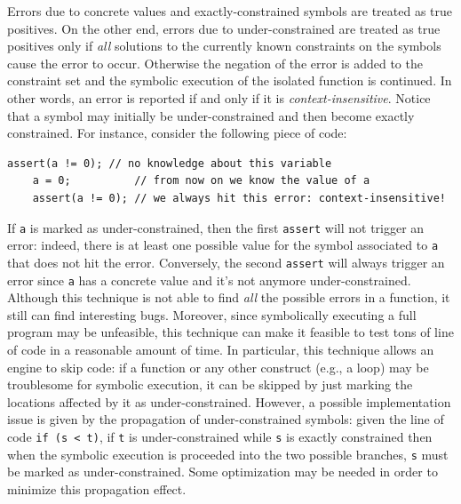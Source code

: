 Errors due to concrete values and exactly-constrained symbols are treated as true positives. On the other end, errors due to under-constrained are treated as true positives only if {\em all} solutions to the currently known constraints on the symbols cause the error to occur. Otherwise the negation of the error is added to the constraint set and the symbolic execution of the isolated function is continued. In other words, an error is reported if and only if it is {\em context-insensitive}. Notice that a symbol may initially be under-constrained and then become exactly constrained. For instance, consider the following piece of code:

    \begin{lstlisting}[basicstyle=\ttfamily\small]
    assert(a != 0); // no knowledge about this variable
    a = 0;          // from now on we know the value of a
    assert(a != 0); // we always hit this error: context-insensitive! 
    \end{lstlisting}

If {\tt a} is marked as under-constrained, then the first {\tt assert} will not trigger an error: indeed, there is at least one possible value for the symbol associated to {\tt a} that does not hit the error. Conversely, the second {\tt assert} will always trigger an error since {\tt a} has a concrete value and it's not anymore under-constrained.\\

Although this technique is not able to find {\em all} the possible errors in a function, it still can find interesting bugs. Moreover, since symbolically executing a full program may be unfeasible, this technique can make it feasible to test tons of line of code in a reasonable amount of time. In particular, this technique allows an engine to skip code: if a function or any other construct (e.g., a loop) may be troublesome for symbolic execution, it can be skipped by just marking the locations affected by it as under-constrained. However, a possible implementation issue is given by the propagation of under-constrained symbols: given the line of code {\tt if (s < t)}, if {\tt t} is under-constrained while {\tt s} is exactly constrained then when the symbolic execution is proceeded into the two possible branches, {\tt s} must be marked as under-constrained. Some optimization may be needed in order to minimize this propagation effect.

